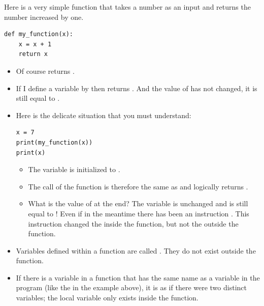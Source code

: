 \documentclass[11pt,class=report,crop=false]{standalone}
\begin{document}
\begin{cours}


Here is a very simple function that takes a number as an input and returns the number increased by one.
\begin{center}
\begin{lstlisting}
def my_function(x):
    x = x + 1
    return x
\end{lstlisting}
\end{center}

\begin{itemize}
  \item Of course  returns .
  
  \item If I define a variable by  then  returns . And the value of  has not changed, it is still equal to .
  
  \item Here is the delicate situation that you must understand:
\begin{center}
\begin{lstlisting}
x = 7
print(my_function(x))
print(x)
\end{lstlisting}
\end{center}
  \begin{itemize}
    \item The variable  is initialized to .
    
    \item The call of the function  is therefore the same as 
      and logically returns .
     
    
    \item What is the value of  at the end? The variable  is unchanged and is still equal to ! Even if in the meantime there has been an instruction . This instruction changed the  inside the function, but not the  outside the function.
\end{itemize}   
\end{itemize} 
 
\bigskip

\begin{itemize}
  \item Variables defined within a function are called 
. 
They do not exist outside the function.
  
  \item If there is a variable in a function that has the same name as a variable in the program (like the  in the example above), it is as if there were two distinct variables; the local variable only exists inside the function.
  

\end{itemize}
\end{cours}
\end{document}
